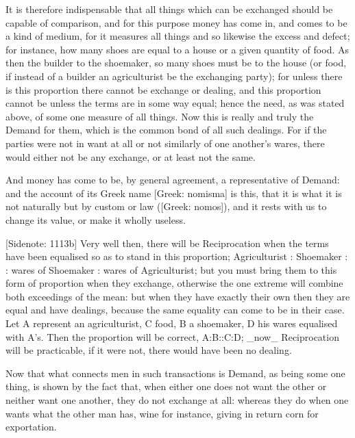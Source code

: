 It is therefore indispensable that all things which can be exchanged
should be capable of comparison, and for this purpose money has come
in, and comes to be a kind of medium, for it measures all things and so
likewise the excess and defect; for instance, how many shoes are equal
to a house or a given quantity of food. As then the builder to the
shoemaker, so many shoes must be to the house (or food, if instead of a
builder an agriculturist be the exchanging party); for unless there is
this proportion there cannot be exchange or dealing, and this proportion
cannot be unless the terms are in some way equal; hence the need, as was
stated above, of some one measure of all things. Now this is really
and truly the Demand for them, which is the common bond of all such
dealings. For if the parties were not in want at all or not similarly of
one another's wares, there would either not be any exchange, or at least
not the same.

And money has come to be, by general agreement, a representative of
Demand: and the account of its Greek name [Greek: nomisma] is this, that
it is what it is not naturally but by custom or law ([Greek: nomos]),
and it rests with us to change its value, or make it wholly useless.

[Sidenote: 1113b] Very well then, there will be Reciprocation when
the terms have been equalised so as to stand in this proportion;
Agriculturist : Shoemaker : : wares of Shoemaker : wares of
Agriculturist; but you must bring them to this form of proportion when
they exchange, otherwise the one extreme will combine both exceedings of
the mean: but when they have exactly their own then they are equal and
have dealings, because the same equality can come to be in their case.
Let A represent an agriculturist, C food, B a shoemaker, D his wares
equalised with A's. Then the proportion will be correct, A:B::C:D; _now_
Reciprocation will be practicable, if it were not, there would have been
no dealing.

Now that what connects men in such transactions is Demand, as being some
one thing, is shown by the fact that, when either one does not want the
other or neither want one another, they do not exchange at all: whereas
they do when one wants what the other man has, wine for instance, giving
in return corn for exportation.

